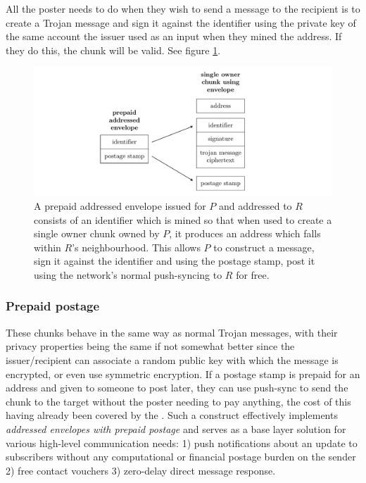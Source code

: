 All the poster needs to do when they wish to send a message to the recipient is to create a Trojan message and sign it against the identifier using the private key of the same account the issuer used as an input when they mined the address. If they do this, the chunk will be valid. See figure \ref{fig:addressed-envelope}.


\begin{figure}[htbp]
   \centering
   \includegraphics[width=\textwidth]{fig/addressed-envelope.pdf}
   \caption[Prepaid addressed envelopes \statusgreen]{A prepaid addressed envelope issued for $P$ and addressed to $R$ consists of an identifier which is mined so that when used to create a single owner chunk owned by $P$, it produces an address which falls within $R$'s neighbourhood. This allows $P$ to construct a message, sign it against the identifier and using the postage stamp, post it using the network's normal push-syncing to $R$ for free. }
   \label{fig:addressed-envelope}
\end{figure}

\subsubsection{Prepaid postage}

These chunks behave in the same way as normal Trojan messages, with their privacy properties being the same if not somewhat better since the issuer/recipient can associate a random public key with which the message is encrypted, or even use symmetric encryption. If a postage stamp is prepaid for an address and given to someone to post later, they can use push-sync to send the chunk to the target without the poster needing to pay anything, the cost of this having already been covered by the . Such a construct effectively implements \emph{addressed envelopes with prepaid postage} and serves as a base layer solution for various high-level communication needs: 1) push notifications about an update to subscribers without any computational or financial postage burden on the sender 2) free contact vouchers 3) zero-delay direct message response.  


